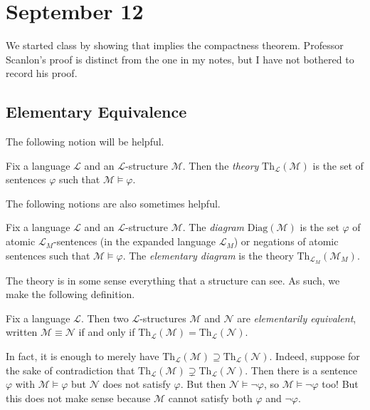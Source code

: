 \documentclass[../notes.tex]{subfiles}
\begin{document}
\section{September 12}

We started class by showing that  implies the compactness theorem. Professor Scanlon's proof is distinct from the one in my notes, but I have not bothered to record his proof.

\subsection{Elementary Equivalence}
The following notion will be helpful.
\begin{definition}[theory]
	Fix a language $\mathcal L$ and an $\mathcal L$-structure $\mathcal M$. Then the \textit{theory} $\mathrm{Th}_\mathcal L(\mathcal M)$ is the set of sentences $\varphi$ such that $\mathcal M\models\varphi$.
\end{definition}
The following notions are also sometimes helpful.
\begin{definition}[diagram]
	Fix a language $\mathcal L$ and an $\mathcal L$-structure $\mathcal M$. The \textit{diagram} $\mathrm{Diag}(\mathcal M)$ is the set $\varphi$ of atomic $\mathcal L_M$-sentences (in the expanded language $\mathcal L_M$) or negations of atomic sentences such that $\mathcal M\models\varphi$. The \textit{elementary diagram} is the theory $\mathrm{Th}_{\mathcal L_M}(\mathcal M_M)$.
\end{definition}
The theory is in some sense everything that a structure can see. As such, we make the following definition.
\begin{definition}
	Fix a language $\mathcal L$. Then two $\mathcal L$-structures $\mathcal M$ and $\mathcal N$ are \textit{elementarily equivalent}, written $\mathcal M\equiv\mathcal N$ if and only if $\mathrm{Th}_\mathcal L(\mathcal M)=\mathrm{Th}_\mathcal L(\mathcal N)$.
\end{definition}
\begin{remark} \label{rem:equiv-by-containment}
	In fact, it is enough to merely have $\mathrm{Th}_\mathcal L(\mathcal M)\supseteq\mathrm{Th}_\mathcal L(\mathcal N)$. Indeed, suppose for the sake of contradiction that $\mathrm{Th}_\mathcal L(\mathcal M)\supsetneq\mathrm{Th}_\mathcal L(\mathcal N)$. Then there is a sentence $\varphi$ with $\mathcal M\models\varphi$ but $\mathcal N$ does not satisfy $\varphi$. But then $\mathcal N\models\lnot\varphi$, so $\mathcal M\models\lnot\varphi$ too! But this does not make sense because $\mathcal M$ cannot satisfy both $\varphi$ and $\lnot\varphi$.
\end{remark}
\end{document}
